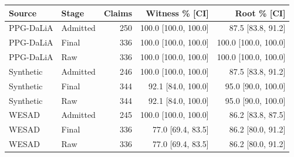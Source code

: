\begin{tabular}{llrrr}
\toprule
Source & Stage & Claims & Witness \% [CI] & Root \% [CI] \\
\midrule
PPG-DaLiA & Admitted & 250 & 100.0 [100.0, 100.0] & 87.5 [83.8, 91.2] \\
PPG-DaLiA & Final & 336 & 100.0 [100.0, 100.0] & 100.0 [100.0, 100.0] \\
PPG-DaLiA & Raw & 336 & 100.0 [100.0, 100.0] & 100.0 [100.0, 100.0] \\
Synthetic & Admitted & 246 & 100.0 [100.0, 100.0] & 87.5 [83.8, 91.2] \\
Synthetic & Final & 344 & 92.1 [84.0, 100.0] & 95.0 [90.0, 100.0] \\
Synthetic & Raw & 344 & 92.1 [84.0, 100.0] & 95.0 [90.0, 100.0] \\
WESAD & Admitted & 245 & 100.0 [100.0, 100.0] & 86.2 [83.8, 87.5] \\
WESAD & Final & 336 & 77.0 [69.4, 83.5] & 86.2 [80.0, 91.2] \\
WESAD & Raw & 336 & 77.0 [69.4, 83.5] & 86.2 [80.0, 91.2] \\
\bottomrule
\end{tabular}
